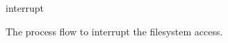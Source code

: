 \documentclass{article}
\def\gpicbox#1{%
\vbox{\unvbox\csname #1\endcsname\kern 0pt}}
\newcommand{\gpicfig}[2]{%

\begin{figure}
\begin{center}
\leavevmode
\gpicbox{#1}
\caption{#2}
\label{fig:#1}
\end{center}
\end{figure}
}
\begin{document}
\gpicfig{interrupt}{The process flow to interrupt the filesystem access.}
\end{document}

